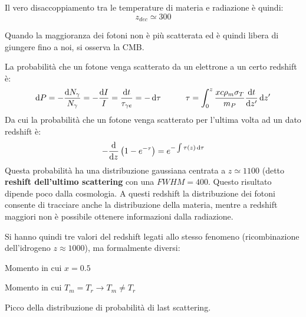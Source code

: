 {Il vero disaccoppiamento tra le temperature di materia e radiazione è quindi:
$$ z_{dec} \simeq 300 $$

Quando la maggioranza dei fotoni non è più scatterata ed è quindi libera di giungere fino a noi, si osserva la CMB.


La probabilità che un fotone venga scatterato da un elettrone a un certo redshift è:
\begin{equation}
    \mathrm{d}P=-\frac{\mathrm{d}N_\gamma}{N_\gamma}=-\frac{\mathrm{d}I}{I}=\frac{\mathrm{d}t}{\tau_{\gamma e}}=-\operatorname{d}\!{\tau} \qquad\quad \tau=\int_0^z \frac{xc\rho_m \sigma_T }{m_P}\frac{\operatorname{d}\!{t}}{\operatorname{d}\!{z'}}\operatorname{d}\!{z'}
\end{equation}
Da cui la probabilità che un fotone venga scatterato per l'ultima volta ad un dato redshift è:
\begin{equation}
    -\frac{\operatorname{d}\!{}}{\operatorname{d}\!{z}}\left( 1-e^{-\tau} \right)=e^{-\int \tau (z)\operatorname{d}\!{\tau}}
\end{equation}
Questa probabilità ha una distribuzione gaussiana centrata a $z\simeq 1100$ (detto \textbf{reshift dell'ultimo scattering} con una $FWHM=400$. Questo risultato dipende poco dalla cosmologia. A questi redshift la distribuzione dei fotoni consente di tracciare anche la distribuzione della materia, mentre a redshift maggiori non è possibile ottenere informazioni dalla radiazione.

\newpage
Si hanno quindi tre valori del redshift legati allo stesso fenomeno (ricombinazione dell'idrogeno $z\approx 1000$), ma formalmente diversi:
\begin{example}[Ricombinazione: $\mathbf{z_{rec}=1500}$]
Momento in cui $x=0.5 $
\end{example}
\begin{example}[Disaccoppiamento:  $\mathbf{z_{dec}=300}$]
Momento in cui $T_m=T_r \rightarrow T_m \neq T_r $
\end{example}
\begin{example}[Last Scattering:  $\mathbf{z_{LS}=1100}$]
Picco della distribuzione di probabilità di last scattering.
\end{example}

}
